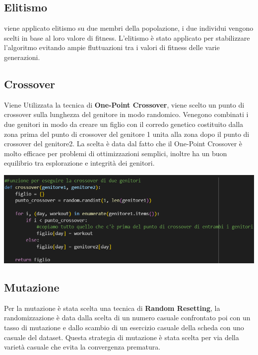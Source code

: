 \documentclass{book}
\begin{document}
  \subsection{Elitismo}
  viene applicato elitismo su due membri della popolazione, i due individui vengono scelti in base al loro valore di fitness. L'elitismo è stato applicato per stabilizzare l'algoritmo evitando ampie fluttuazioni tra i valori di fitness delle varie generazioni. \newline
  


  \subsection{Crossover}
  Viene Utilizzata la tecnica di \textbf{One-Point Crossover}, viene scelto un punto di crossover sulla lunghezza del genitore in modo randomico. Venegono combinati i due genitori in modo da creare un figlio con il corredo genetico costituito dalla zona prima del punto di crossover del genitore 1 unita alla zona dopo il punto di crossover del genitore2. La scelta è data dal fatto che il One-Point Crossover è molto efficace per problemi di ottimizzazioni semplici, inoltre ha un buon equilibrio tra esplorazione e integrità dei genitori.\newline

  \includegraphics[width=1.0\linewidth]{Crossover.png} 
  
  \subsection{Mutazione}
  Per la mutazione è stata scelta una tecnica di \textbf{Random Resetting}, la randomizzazione è data dalla scelta di un numero casuale confrontato poi con un tasso di mutazione e dallo scambio di un esercizio casuale della scheda con uno casuale del dataset. Questa strategia di mutazione è stata scelta per via della varietà casuale che evita la convergenza prematura.\newline
\end{document}
